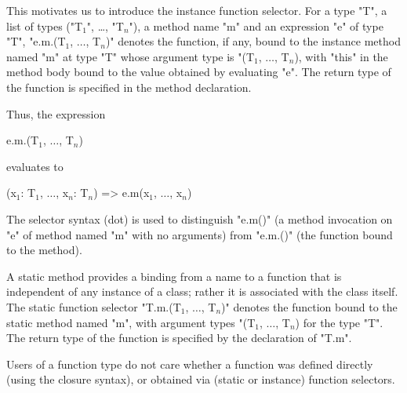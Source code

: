 
This motivates us to introduce the instance function selector. For a
type \xcd"T", a list of types
(\xcdmath"T$_1$", \dots,
\xcdmath"T$_n$"), 
a method name
\xcd"m" and an expression \xcd"e" of type \xcd"T",
\xcdmath"e.m.(T$_1$, $\dots$, T$_n$)" denotes the function,
if any, bound to the instance method named \xcd"m" at type
\xcd"T" whose argument
type is
\xcdmath"(T$_1$, $\dots$, T$_n$), with \xcd"this" in the method
body bound to the value obtained
by evaluating \xcd"e". The
return type of the function is specified in the method declaration.

Thus, the expression

\begin{xtenmath}
e.m.(T$_1$, $\dots$, T$_n$)
\end{xtenmath}

evaluates to

\begin{xtenmath}
(x$_1$: T$_1$, $\dots$, x$_n$: T$_n$) => e.m(x$_1$, $\dots$, x$_n$)
\end{xtenmath}

\begin{note}
The selector syntax (dot) is used to distinguish \xcd"e.m()" (a
method invocation on \xcd"e" of method named \xcd"m" with no arguments)
from \xcd"e.m.()"
(the function bound to the method). 
\end{note}

A static method provides a binding from a name to a function that is
independent of any instance of a class; rather it is associated with the
class itself. The static function selector
\xcdmath"T.m.(T$_1$, $\dots$, T$_n$)" denotes the
function bound to the static method named \xcd"m", with argument types
\xcdmath"(T$_1$, $\dots$, T$_n$) for the type \xcd"T". The return type
of the function is specified by the declaration of \xcd"T.m".

Users of a function type do not care whether a function was defined
directly (using the closure syntax), or obtained via (static or
instance) function selectors.

